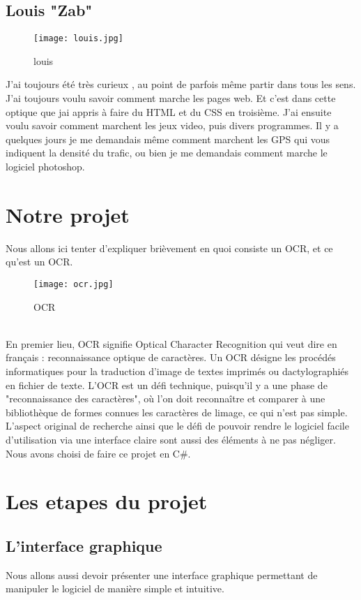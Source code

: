 \documentclass{article}
\begin{document}
             \subsection{Louis "Zab"}
    \begin{figure}[hp]
	    \centering
	    \texttt{[image: louis.jpg]}
	    \caption{louis}
    \end{figure}
J'ai toujours été très curieux , au point de parfois même partir dans tous les sens. J'ai
toujours voulu savoir comment marche les pages web. Et c'est dans cette optique que
jai appris à faire du HTML et du CSS en troisième. J'ai ensuite voulu savoir comment
marchent les jeux video, puis divers programmes. Il y a quelques jours je me demandais
même comment marchent les GPS qui vous indiquent la densité du trafic, ou bien
je me demandais comment marche le logiciel photoshop.\\

\newpage

    \section{Notre projet}
Nous allons ici tenter d’expliquer brièvement en quoi consiste un OCR, et ce qu’est
un OCR.

    \begin{figure}[hp]
	    \centering
	    \texttt{[image: ocr.jpg]}
	    \caption{OCR}
    \end{figure}
\\
En premier lieu, OCR signifie Optical Character Recognition qui veut dire en français
: reconnaissance optique de caractères. Un OCR désigne les procédés informatiques
pour la traduction d'image de textes imprimés ou dactylographiés en fichier de
texte. L'OCR est un défi technique, puisqu'il y a une phase de "reconnaissance des caractères",
où l'on doit reconnaître et comparer à une bibliothèque de formes connues les
caractères de limage, ce qui n'est pas simple. L'aspect original de recherche ainsi que le
défi de pouvoir rendre le logiciel facile d'utilisation via une interface claire sont aussi
des éléments à ne pas négliger. Nous avons choisi de faire ce projet en C#.


\newpage
     \section{Les etapes du projet}
            \subsection{L'interface graphique}
Nous allons aussi devoir présenter une interface graphique permettant de manipuler
le logiciel de manière simple et intuitive.
\end{document}
